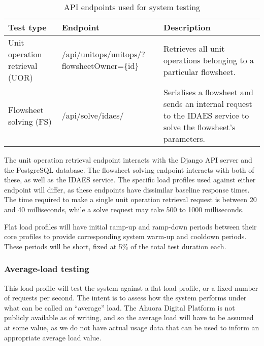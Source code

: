 \begin{table}[h]
    \centering
    \begin{tabularx}{\textwidth}{|p{}|X|p{}|}
        \hline
        \textbf{Test type} & \textbf{Endpoint} & \textbf{Description} \\ \hline
        Unit operation retrieval (UOR) & /api/unitops/unitops/?flowsheetOwner=\{id\} & Retrieves all unit operations belonging to a particular flowsheet. \\ \hline

        Flowsheet solving (FS) & /api/solve/idaes/ & Serialises a flowsheet and sends an internal request to the IDAES service to solve the flowsheet's parameters. \\ \hline
    \end{tabularx}
    \caption{API endpoints used for system testing}
    \label{table:test-api-endpoints}
\end{table}

The unit operation retrieval endpoint interacts with the Django API server and the PostgreSQL database. The flowsheet solving endpoint interacts with both of these, as well as the IDAES service. The specific load profiles used against either endpoint will differ, as these endpoints have dissimilar baseline response times. The time required to make a single unit operation retrieval request is between 20 and 40 milliseconds, while a solve request may take 500 to 1000 milliseconds.


Flat load profiles will have initial ramp-up and ramp-down periods between their core profiles to provide corresponding system warm-up and cooldown periods. These periods will be short, fixed at 5\% of the total test duration each.

\subsubsection{Average-load testing}

This load profile will test the system against a flat load profile, or a fixed number of requests per second. The intent is to assess how the system performs under what can be called an ``average'' load. The Ahuora Digital Platform is not publicly available as of writing, and so the average load will have to be assumed at some value, as we do not have actual usage data that can be used to inform an appropriate average load value.

